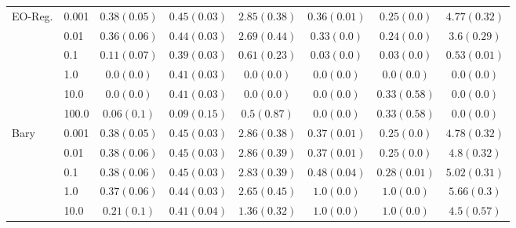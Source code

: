 \begin{table*}
\begin{tabular*}{\linewidth}{ll| *{3}{c}|*{3}{c}}
\midrule
EO-Reg. & 0.001 & $0.38\scriptscriptstyle(0.05)$ & $0.45\scriptscriptstyle(0.03)$ & $2.85\scriptscriptstyle(0.38)$ & $0.36\scriptscriptstyle(0.01)$ & $0.25\scriptscriptstyle(0.0)$ & $4.77\scriptscriptstyle(0.32)$ \\
	 & 0.01 & $0.36\scriptscriptstyle(0.06)$ & $0.44\scriptscriptstyle(0.03)$ & $2.69\scriptscriptstyle(0.44)$ & $0.33\scriptscriptstyle(0.0)$ & $0.24\scriptscriptstyle(0.0)$ & $3.6\scriptscriptstyle(0.29)$ \\
	 & 0.1 & $0.11\scriptscriptstyle(0.07)$ & $0.39\scriptscriptstyle(0.03)$ & $0.61\scriptscriptstyle(0.23)$ & $0.03\scriptscriptstyle(0.0)$ & $0.03\scriptscriptstyle(0.0)$ & $0.53\scriptscriptstyle(0.01)$ \\
	 & 1.0 & $0.0\scriptscriptstyle(0.0)$ & $0.41\scriptscriptstyle(0.03)$ & $0.0\scriptscriptstyle(0.0)$ & $0.0\scriptscriptstyle(0.0)$ & $0.0\scriptscriptstyle(0.0)$ & $0.0\scriptscriptstyle(0.0)$ \\
	 & 10.0 & $0.0\scriptscriptstyle(0.0)$ & $0.41\scriptscriptstyle(0.03)$ & $0.0\scriptscriptstyle(0.0)$ & $0.0\scriptscriptstyle(0.0)$ & $0.33\scriptscriptstyle(0.58)$ & $0.0\scriptscriptstyle(0.0)$ \\
	 & 100.0 & $0.06\scriptscriptstyle(0.1)$ & $0.09\scriptscriptstyle(0.15)$ & $0.5\scriptscriptstyle(0.87)$ & $0.0\scriptscriptstyle(0.0)$ & $0.33\scriptscriptstyle(0.58)$ & $0.0\scriptscriptstyle(0.0)$ \\
\midrule
Bary & 0.001 & $0.38\scriptscriptstyle(0.05)$ & $0.45\scriptscriptstyle(0.03)$ & $2.86\scriptscriptstyle(0.38)$ & $0.37\scriptscriptstyle(0.01)$ & $0.25\scriptscriptstyle(0.0)$ & $4.78\scriptscriptstyle(0.32)$ \\
	 & 0.01 & $0.38\scriptscriptstyle(0.06)$ & $0.45\scriptscriptstyle(0.03)$ & $2.86\scriptscriptstyle(0.39)$ & $0.37\scriptscriptstyle(0.01)$ & $0.25\scriptscriptstyle(0.0)$ & $4.8\scriptscriptstyle(0.32)$ \\
	 & 0.1 & $0.38\scriptscriptstyle(0.06)$ & $0.45\scriptscriptstyle(0.03)$ & $2.83\scriptscriptstyle(0.39)$ & $0.48\scriptscriptstyle(0.04)$ & $0.28\scriptscriptstyle(0.01)$ & $5.02\scriptscriptstyle(0.31)$ \\
	 & 1.0 & $0.37\scriptscriptstyle(0.06)$ & $0.44\scriptscriptstyle(0.03)$ & $2.65\scriptscriptstyle(0.45)$ & $1.0\scriptscriptstyle(0.0)$ & $1.0\scriptscriptstyle(0.0)$ & $5.66\scriptscriptstyle(0.3)$ \\
	 & 10.0 & $0.21\scriptscriptstyle(0.1)$ & $0.41\scriptscriptstyle(0.04)$ & $1.36\scriptscriptstyle(0.32)$ & $1.0\scriptscriptstyle(0.0)$ & $1.0\scriptscriptstyle(0.0)$ & $4.5\scriptscriptstyle(0.57)$ \\

\end{tabular*}
\end{table*}

